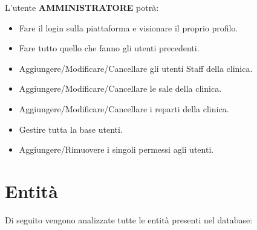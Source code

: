 \documentclass[paper=a4, fontsize=11pt,x11names]{report}
\begin{document}
L'utente \textbf{AMMINISTRATORE} potrà:
\begin{itemize}
\item Fare il login sulla piattaforma e visionare il proprio profilo.
\item Fare tutto quello che fanno gli utenti precedenti.
\item Aggiungere/Modificare/Cancellare gli utenti Staff della clinica.
\item Aggiungere/Modificare/Cancellare le sale della clinica.
\item Aggiungere/Modificare/Cancellare i reparti della clinica.
\item Gestire tutta la base utenti.
\item Aggiungere/Rimuovere i singoli permessi agli utenti.
\end{itemize}

\newpage
\section{Entità}
Di seguito vengono analizzate tutte le entità presenti nel database:


\end{document}
